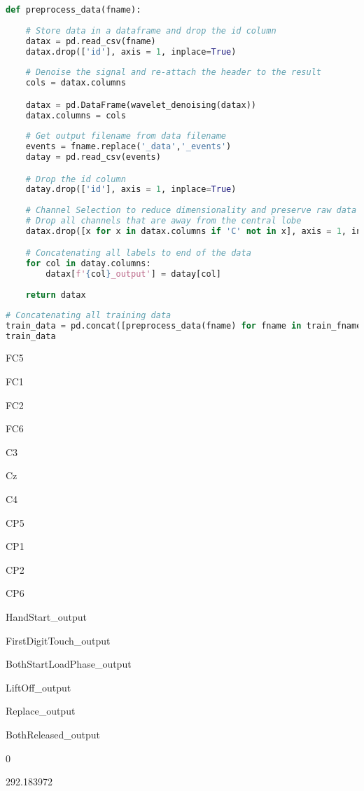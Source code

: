 \begin{lstlisting}[language=Python]
def preprocess_data(fname):
    
    # Store data in a dataframe and drop the id column
    datax = pd.read_csv(fname)
    datax.drop(['id'], axis = 1, inplace=True)
    
    # Denoise the signal and re-attach the header to the result
    cols = datax.columns

    datax = pd.DataFrame(wavelet_denoising(datax))
    datax.columns = cols
    
    # Get output filename from data filename
    events = fname.replace('_data','_events') 
    datay = pd.read_csv(events)

    # Drop the id column
    datay.drop(['id'], axis = 1, inplace=True)
    
    # Channel Selection to reduce dimensionality and preserve raw data
    # Drop all channels that are away from the central lobe
    datax.drop([x for x in datax.columns if 'C' not in x], axis = 1, inplace=True)

    # Concatenating all labels to end of the data
    for col in datay.columns:
        datax[f'{col}_output'] = datay[col]
    
    return datax
\end{lstlisting}

\begin{lstlisting}[language=Python]
# Concatenating all training data 
train_data = pd.concat([preprocess_data(fname) for fname in train_fnames])
train_data
\end{lstlisting}

FC5

FC1

FC2

FC6

C3

Cz

C4

CP5

CP1

CP2

CP6

HandStart\_output

FirstDigitTouch\_output

BothStartLoadPhase\_output

LiftOff\_output

Replace\_output

BothReleased\_output

0

292.183972

